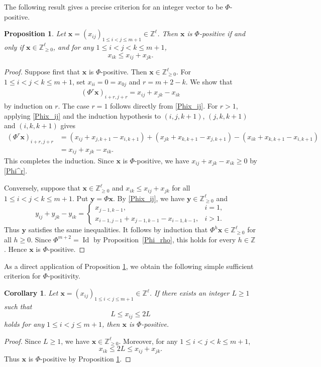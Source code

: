 \documentclass[11pt,a4paper]{amsart}
\newtheorem{corollary}[theorem]{Corollary}
\newtheorem{proposition}[theorem]{Proposition}
\theoremstyle{definition}
\numberwithin{equation}{section}
\newcommand{\Z}{\mathbb{Z}}
\newcommand{\x}{\mathbf{x}}
\newcommand{\0}{\mathbf{0}}
\begin{document}
	The following result gives a precise criterion for an integer vector to be
	$\Phi$-positive. 
	
	\begin{proposition}\label{triangle inequalities}
		Let $\x=(x_{ij})_{1\le i<j\le m+1}\in \Z^{\ell}$. Then $\x$ is $\Phi$-positive if and only if $\x\in \Z^{\ell}_{\ge 0}$, and for any $1\le i<j<k\le m+1$,
		$$x_{ik}\le x_{ij}+x_{jk}.$$
	\end{proposition}
	\begin{proof}
		Suppose first that $\x$ is $\Phi$-positive. Then $\x\in \Z^{\ell}_{\ge 0}$.
		For $1\le i<j<k\le m+1$, set $x_{ii}=0=x_{0j}$ and $r=m+2-k$. We show  that
		\begin{align} \label{Phi^r}
			(\Phi^r\x)_{i+r,j+r}=x_{ij}+x_{jk}-x_{ik}
		\end{align}
		by induction on $r$. 
		The case $r=1$ follows directly from \eqref{Phix_ij}.
		For $r>1$, applying \eqref{Phix_ij} and the induction hypothesis
		to $(i,j,k+1)$, $(j,k,k+1)$ and $(i,k,k+1)$ gives
		\[
		\begin{aligned}
			(\Phi^r\x)_{i+r,j+r}
			&=(x_{ij}+x_{j,k+1}-x_{i,k+1})
			+(x_{jk}+x_{k,k+1}-x_{j,k+1})
			-(x_{ik}+x_{k,k+1}-x_{i,k+1})\\
			&=x_{ij}+x_{jk}-x_{ik}.
		\end{aligned}
		\]
		This completes the induction.  Since $\x$ is $\Phi$-positive,  we have $x_{ij}+x_{jk}-x_{ik}\ge0$ by \eqref{Phi^r}. 
		
		Conversely, suppose that $\x\in \Z^{\ell}_{\ge 0}$ and
		$x_{ik}\le x_{ij}+x_{jk}$ for all $1\le i<j<k\le m+1$.
		Put $\mathbf y=\Phi\x$. By \eqref{Phix_ij}, we have
		$\mathbf y\in \Z^{\ell}_{\ge 0}$ and
		\[
		y_{ij}+y_{jk}-y_{ik}
		=
		\begin{cases}
			x_{j-1,k-1},&i=1,\\
			x_{i-1,j-1}+x_{j-1,k-1}-x_{i-1,k-1},&i>1.
		\end{cases}
		\]
		Thus $\mathbf y$ satisfies the same inequalities.
		It follows by induction that $\Phi^h\x\in \Z^{\ell}_{\ge 0}$ for all $h\ge0$.
		Since $\Phi^{m+2}=\operatorname{Id}$ by
		Proposition~\ref{Phi_rho}, this holds for every $h\in\mathbb Z$.
		Hence $\x$ is $\Phi$-positive.	
	\end{proof}
	
	As a direct application of  Proposition \ref{triangle inequalities}, we obtain the following simple sufficient
	criterion for $\Phi$-positivity. 
	
		\begin{corollary} \label{Squeeze}
		Let $\x=(x_{ij})_{1\le i<j\le m+1}\in\Z^\ell$. 
		If there exists an integer $L\ge1$ such that
		\[
		L\le x_{ij}\le2L
		\] holds for any $1\le i<j\le m+1$,
		then $\x$ is $\Phi$-positive.
	\end{corollary}
	\begin{proof}
		Since $L\ge1$, we have $\x\in\Z_{\ge0}^{\ell}$. Moreover,
		for any $1\le i<j<k\le m+1$,
		\[
		x_{ik}\le2L\le x_{ij}+x_{jk}.
		\]
		Thus $\x$ is $\Phi$-positive by Proposition \ref{triangle inequalities}.
	\end{proof}
	
\end{document}
